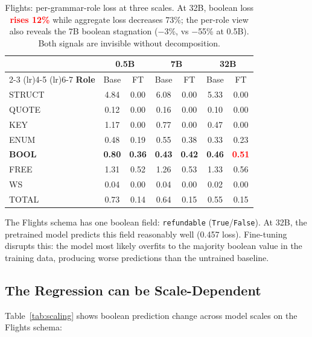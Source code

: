 \documentclass{article}
\newcommand{\regress}[1]{\textcolor{red}{\textbf{#1}}}
\begin{document}
\begin{table}[t]
\centering
\small
\begin{tabular}{lcccccc}
\toprule
 & \multicolumn{2}{c}{\textbf{0.5B}} & \multicolumn{2}{c}{\textbf{7B}} & \multicolumn{2}{c}{\textbf{32B}} \\
\cmidrule(lr){2-3} \cmidrule(lr){4-5} \cmidrule(lr){6-7}
\textbf{Role} & Base & FT & Base & FT & Base & FT \\
\midrule
STRUCT  & 4.84 & 0.00 & 6.08 & 0.00 & 5.33 & 0.00 \\
QUOTE   & 0.12 & 0.00 & 0.16 & 0.00 & 0.10 & 0.00 \\
KEY     & 1.17 & 0.00 & 0.77 & 0.00 & 0.47 & 0.00 \\
ENUM    & 0.48 & 0.19 & 0.55 & 0.38 & 0.33 & 0.23 \\
\textbf{BOOL} & \textbf{0.80} & \textbf{0.36} & \textbf{0.43} & \textbf{0.42} & \textbf{0.46} & \regress{0.51} \\
FREE    & 1.31 & 0.52 & 1.26 & 0.53 & 1.33 & 0.56 \\
WS      & 0.04 & 0.00 & 0.04 & 0.00 & 0.02 & 0.00 \\
\midrule
TOTAL   & 0.73 & 0.14 & 0.64 & 0.15 & 0.55 & 0.15 \\
\bottomrule
\end{tabular}
\caption{Flights: per-grammar-role loss at three scales. At 32B, boolean loss \regress{rises 12\%} while aggregate loss decreases 73\%; the per-role view also reveals the 7B boolean stagnation ($-$3\%, vs $-$55\% at 0.5B). Both signals are invisible without decomposition.}
\label{tab:flights_decomp}
\end{table}

The Flights schema has one boolean field: \texttt{refundable} (\texttt{True}/\texttt{False}). At 32B, the pretrained model predicts this field reasonably well (0.457 loss). Fine-tuning disrupts this: the model most likely overfits to the majority boolean value in the training data, producing worse predictions than the untrained baseline.

\subsection{The Regression can be Scale-Dependent}\label{sec:scaling}

Table~\ref{tab:scaling} shows boolean prediction change across model scales on the Flights schema:
\end{document}
